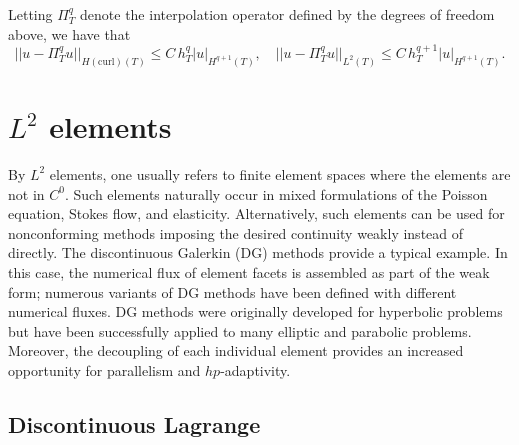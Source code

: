 Letting $\Pi_T^q$ denote the interpolation operator defined by the
degrees of freedom above, we have that \citep[Proposition 3]{Nedelec1986}
\begin{equation}
  ||u - \Pi_T^q u||_{H(\mathrm{curl})(T)} \leqslant C \, h_T^{q} |u|_{H^{q+1}(T)}, \quad
  ||u - \Pi_T^q u||_{L^2(T)} \leqslant C \, h_T^{q+1} |u|_{H^{q+1}(T)}.
\end{equation}

\section{$L^2$ elements}

By $L^2$ elements, one usually refers to finite element spaces where
the elements are not in $C^0$. Such elements naturally occur in mixed
formulations of the Poisson equation, Stokes flow, and
elasticity. Alternatively, such elements can be used for nonconforming
methods imposing the desired continuity weakly instead of
directly. The discontinuous Galerkin (DG) methods provide a typical
example. In this case, the numerical flux of element facets is
assembled as part of the weak form; numerous variants of DG methods
have been defined with different numerical fluxes. DG methods were
originally developed for hyperbolic problems but have been
successfully applied to many elliptic and parabolic
problems. Moreover, the decoupling of each individual element provides
an increased opportunity for parallelism and $hp$-adaptivity.

\subsection{Discontinuous Lagrange}

